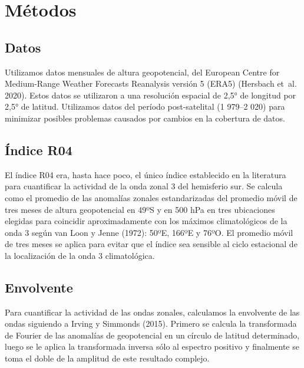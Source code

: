 \documentclass[12pt,oneside,a4paper]{reedthesis}
\begin{document}
\hypertarget{muxe9todos}{%
\section{Métodos}\label{muxe9todos}}

\hypertarget{datos}{%
\subsection{Datos}\label{datos}}

Utilizamos datos mensuales de altura geopotencial, del European Centre for Medium-Range Weather Forecasts Reanalysis versión 5 (ERA5) (Hersbach et~al. 2020). Estos datos se utilizaron a una resolución espacial de 2,5° de longitud por 2,5° de latitud.
Utilizamos datos del período post-satelital (1 979--2 020) para minimizar posibles problemas causados por cambios en la cobertura de datos.

\hypertarget{uxedndice-r04}{%
\subsection{Índice R04}\label{uxedndice-r04}}

El índice R04 era, hasta hace poco, el único índice establecido en la literatura para cuantificar la actividad de la onda zonal 3 del hemisferio sur.
Se calcula como el promedio de las anomalías zonales estandarizadas del promedio móvil de tres meses de altura geopotencial en 49ºS y en 500 hPa en tres ubicaciones elegidas para coincidir aproximadamente con los máximos climatológicos de la onda 3 según van Loon y Jenne (1972): 50ºE, 166ºE y 76ºO.
El promedio móvil de tres meses se aplica para evitar que el índice sea sensible al ciclo estacional de la localización de la onda 3 climatológica.

\hypertarget{envolvente}{%
\subsection{Envolvente}\label{envolvente}}

Para cuantificar la actividad de las ondas zonales, calculamos la envolvente de las ondas siguiendo a Irving y Simmonds (2015).
Primero se calcula la transformada de Fourier de las anomalías de geopotencial en un círculo de latitud determinado, luego se le aplica la transformada inversa sólo al espectro positivo y finalmente se toma el doble de la amplitud de este resultado complejo.
\end{document}
